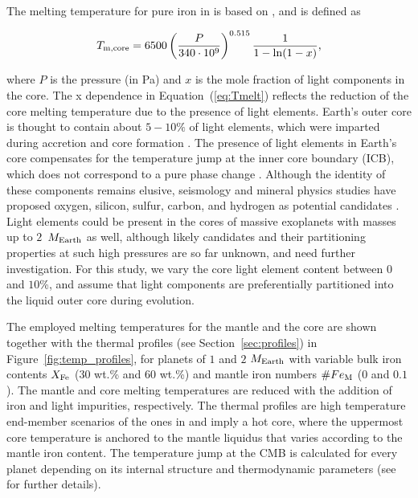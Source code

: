 \documentclass[draft]{agujournal2019} %
\begin{document}
The melting temperature for pure iron in  is based on , and is defined as
\begin{linenomath*}
\begin{equation}
\label{eq:Tmelt}
T_{\rm m,core} = 6500  \left (\frac{P}{340\cdot 10^{\rm 9}}\right)^{0.515} \frac{1}{1 - \ln(1-x) },
\end{equation}
\end{linenomath*}
where $P$ is the pressure (in Pa) and $x$ is the mole fraction of light components in the core. The x dependence in Equation~(\ref{eq:Tmelt}) reflects the reduction of the core melting temperature due to the presence of light elements. Earth's outer core is thought to contain about $5-10\%$ of light elements, which were imparted during accretion and core formation \cite{wood2006accretion,rubie2011heterogeneous,badro_core_2015}. The presence of light elements in Earth's core compensates for the temperature jump at the inner core boundary (ICB), which does not correspond to a pure phase change \cite{hirose2013composition,badro_core_2015}. Although the identity of these components remains elusive, seismology and mineral physics studies have proposed oxygen, silicon, sulfur, carbon, and hydrogen  as potential candidates \cite{hirose2013composition}. Light elements could be present in the cores of massive exoplanets with masses up to $2$~$M_{\rm Earth}$ as well, although likely candidates and their partitioning properties at such high pressures are so far unknown, and need further investigation. For this study, we vary the core light element content between $0$ and $10$\%, and assume that light components are preferentially partitioned into the liquid outer core during evolution.

The employed melting temperatures for the mantle and the core are shown together with the thermal profiles (see Section~\ref{sec:profiles}) in Figure~\ref{fig:temp_profiles}, for planets of $1$ and $2$ $M_{\rm Earth}$ with variable bulk iron contents $X_{\rm Fe}$ (30 wt.\% and 60 wt.\%) and mantle iron numbers $\#Fe_{\rm M}$ ($0$ and $0.1$). The mantle and core melting temperatures are reduced with the addition of iron and light impurities, respectively. The thermal profiles are high temperature end-member scenarios of the ones in  and imply a hot core, where the uppermost core temperature is anchored to the mantle liquidus that varies according to the mantle iron content. The temperature jump at the CMB is calculated for every planet depending on its internal structure and thermodynamic parameters (see  for further details).
\end{document}
